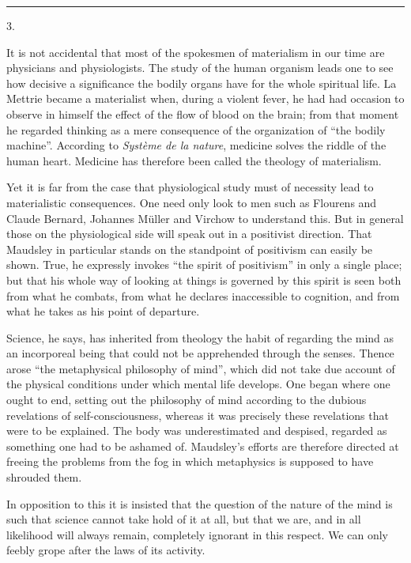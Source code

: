 \documentclass[12pt,a4paper,openany]{book}
\newcommand{\secnum}[1]{\par\begin{center}#1\end{center}\par\nobreak}
\newcommand{\opage}[1]{\marginnote{\footnotesize\textit{[#1]}}}
\begin{document}
\begin{center}\rule{1.8cm}{0.4pt}\end{center}

\secnum{3.}

It is not accidental that most of the spokesmen of materialism
in our time are physicians and physiologists. The study of the
human organism leads one to see how decisive a
significance the bodily organs have for the whole spiritual
life. La Mettrie became a materialist when, during a violent
fever, he had had occasion to observe in himself the effect of the flow
of blood on the brain; from that moment he regarded
thinking as a mere consequence of the organization of ``the bodily machine''.
According to \textit{Système de la nature}, medicine
solves the riddle of the human heart. Medicine has therefore
been called the theology of materialism.

Yet it is far from the case that physiological study
must of necessity lead to materialistic consequences.
One need only look to men such as Flourens and
Claude Bernard, Johannes Müller and Virchow to understand
this. But in general those on the physiological
\opage{310}side will speak out in a positivist direction. That Maudsley in particular
stands on the standpoint of positivism can easily be shown.
True, he expressly invokes ``the spirit of positivism''
in only a single place; but that his whole way of looking at things is
governed by this spirit is seen both from what he combats,
from what he declares inaccessible to cognition, and
from what he takes as his point of departure.

Science, he says, has inherited from theology the
habit of regarding the mind as an incorporeal being that
could not be apprehended through the senses. Thence arose ``the
metaphysical philosophy of mind'', which did not take due account of
the physical conditions under which mental life develops.
One began where one ought to end, setting out
the philosophy of mind according to the dubious revelations of self-consciousness,
whereas it was precisely these revelations that
were to be explained. The body was underestimated and despised,
regarded as something one had to be ashamed of. Maudsley's
efforts are therefore directed at freeing the problems
from the fog in which metaphysics is supposed to have shrouded them.

In opposition to this it is insisted that the question of
the nature of the mind is such that science cannot
take hold of it at all, but that we are, and in all likelihood will always
remain, completely ignorant in this respect. We
can only feebly grope after the laws of its activity.
\end{document}
